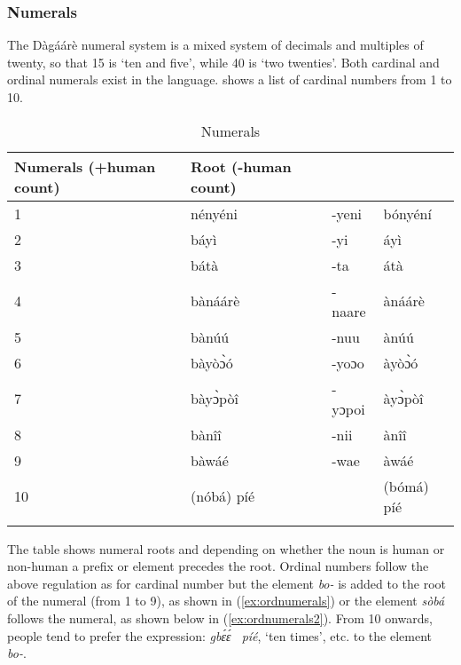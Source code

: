 \subsubsection{Numerals}
The Dàgáárè numeral system is a mixed system of decimals and multiples of twenty,
so that 15 is ‘ten and five’, while 40 is ‘two twenties’. Both cardinal and ordinal numerals exist
in the language.  shows a list of cardinal numbers from 1 to 10.
\begin{table}[]
    \centering
    \begin{tabular}{llll}\lsptoprule
Numerals (+human count) & Root (-human count) \\\midrule
1 &nényéni &-yeni& bónyéní \\
2 &báyì &-yi&  áyì\\
3 &bátà &-ta& átà \\
4 &bànáárè& -naare& ànáárè\\
5 &bànúú &-nuu& ànúú\\
6 &bàyòɔ̀ó& -yoɔo& àyòɔ̀ó \\
7 &bàyɔ̀pòî& -yɔpoi& àyɔ̀pòî \\
8 &bànîî &-nii & ànîî \\
9 &bàwáé &-wae& àwáé \\
10 &(nóbá) píé&& (bómá) píé\\\lspbottomrule
\end{tabular}
    \caption{Numerals}
    \label{tab:numerals}
\end{table}  



The table shows numeral roots and depending on whether the noun is human or non-human a
prefix or element precedes the root. Ordinal numbers follow the above regulation as for
cardinal number but the element \textit{bo-} is added to the root of the numeral (from 1 to 9), as
shown in (\ref{ex:ordnumerals}) or the element \textit{sòbá}  follows the numeral, as shown below in (\ref{ex:ordnumerals2}). From 10
onwards, people tend to prefer the expression: \textit{gbɛ́ɛ́~ píé}, ‘ten times’, etc. to the element \textit{bo-}.

\ea {}
\z\z

